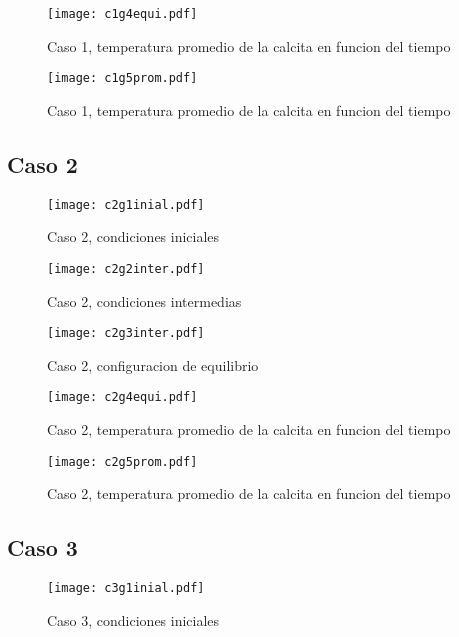 \documentclass[reprint,amsmath,amssymb]{revtex4-1}
\begin{document}
\begin{figure}[h!]
    \centering
    \texttt{[image: c1g4equi.pdf]}
    \caption{Caso 1, temperatura promedio de la calcita en funcion del tiempo}
\end{figure}

\begin{figure}[h!]
    \centering
    \texttt{[image: c1g5prom.pdf]}
    \caption{Caso 1, temperatura promedio de la calcita en funcion del tiempo}
\end{figure}

\subsection{Caso 2}

\begin{figure}[h!]
    \centering
    \texttt{[image: c2g1inial.pdf]}
    \caption{Caso 2, condiciones iniciales}
\end{figure}

\begin{figure}[h!]
    \centering
    \texttt{[image: c2g2inter.pdf]}
    \caption{Caso 2, condiciones intermedias}
\end{figure}

\begin{figure}[h!]
    \centering
    \texttt{[image: c2g3inter.pdf]}
    \caption{Caso 2, configuracion de equilibrio}
\end{figure}

\begin{figure}[h!]
    \centering
    \texttt{[image: c2g4equi.pdf]}
    \caption{Caso 2, temperatura promedio de la calcita en funcion del tiempo}
\end{figure}

\begin{figure}[h!]
    \centering
    \texttt{[image: c2g5prom.pdf]}
    \caption{Caso 2, temperatura promedio de la calcita en funcion del tiempo}
\end{figure}

\subsection{Caso 3}

\begin{figure}[h!]
    \centering
    \texttt{[image: c3g1inial.pdf]}
    \caption{Caso 3, condiciones iniciales}
\end{figure}
\end{document}
